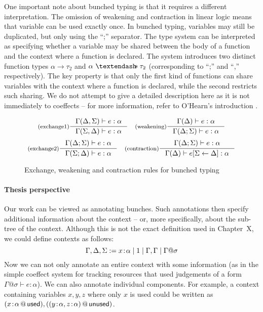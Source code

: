 One important note about bunched typing is that it requires a different interpretation. The omission
of weakening and contraction in linear logic means that variable can be used exactly once. 
In bunched typing, variables may still be duplicated, but only using the ``;'' separator.
The type system can be interpreted as specifying whether a variable may be shared between the 
body of a function and the context where a function is declared. The system introduces two 
distinct function types $\alpha \rightarrow \tau_2$ and $\alpha~ \textendash\!\!\!\ast \tau_2$
(corresponding to ``;'' and ``,'' respectively). The key property is that only the first kind
of functions can share variables with the context where a function is declared, while the second
restricts such sharing. We do not attempt to give a detailed description here as it is not 
immediately to coeffects -- for more information, refer to O'Hearn's introduction 
\cite{substruct-bunched}.

\begin{figure}
\begin{equation*}
\inference[(exchange1)]
  {\Gamma(\Delta, \Sigma) \vdash e : \alpha}
  {\Gamma(\Sigma, \Delta) \vdash e : \alpha}
\quad
\inference[(weakening)]
  {\Gamma(\Delta) \vdash e : \alpha}
  {\Gamma(\Delta; \Sigma) \vdash e : \alpha}
\end{equation*}
\begin{equation*}
\inference[(exchange2)]
  {\Gamma(\Delta; \Sigma) \vdash e : \alpha}
  {\Gamma(\Sigma; \Delta) \vdash e : \alpha}
\quad
\inference[(contraction)]
  {\Gamma(\Delta; \Sigma) \vdash e : \alpha}
  {\Gamma(\Delta) \vdash \subst{e}{\Sigma}{\Delta} : \alpha}
\end{equation*}
\caption{Exchange, weakening and contraction rules for bunched typing}
\label{fig:substructural-bunched}
\end{figure}


\paragraph{Thesis perspective}

Our work can be viewed as annotating bunches. Such annotations then specify additional information
about the context -- or, more specifically, about the sub-tree of the context. Although this is not
the exact definition used in Chapter~X, we could define contexts as follows:
%
\begin{equation*}
\Gamma, \Delta, \Sigma := x\!:\!\alpha \; | \; 1 \; | \; \Gamma, \Gamma \; | \; \Gamma @ \sigma
\end{equation*}
%
Now we can not only annotate an entire context with some information (as in the simple coeffect
system for tracking resources that used judgements of a form $\Gamma @ \sigma \vdash e : \alpha$).
We can also annotate individual components. For example, a context containing variables $x,y,z$
where only $x$ is used could be written as $(x\!:\!\alpha \,@\, \textnormal{\sffamily used}), ((y\!:\!\alpha, z\!:\!\alpha) 
\,@\, \textnormal{\sffamily unused})$.

